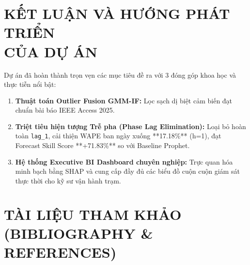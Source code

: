 \documentclass[12pt,a4paper]{article}
\begin{document}
\section[KẾT LUẬN VÀ HƯỚNG PHÁT TRIỂN]{KẾT LUẬN VÀ HƯỚNG PHÁT TRIỂN\\CỦA DỰ ÁN}
Dự án đã hoàn thành trọn vẹn các mục tiêu đề ra với 3 đóng góp khoa học và thực tiễn nổi bật:
\begin{enumerate}
    \item \textbf{Thuật toán Outlier Fusion GMM-IF:} Lọc sạch dị biệt cảm biến đạt chuẩn bài báo IEEE Access 2025.
    \item \textbf{Triệt tiêu hiện tượng Trễ pha (Phase Lag Elimination):} Loại bỏ hoàn toàn \texttt{lag\_1}, cải thiện WAPE ban ngày xuống **17.18\%** (h=1), đạt Forecast Skill Score **+71.83\%** so với Baseline Prophet.
    \item \textbf{Hệ thống Executive BI Dashboard chuyên nghiệp:} Trực quan hóa minh bạch bằng SHAP và cung cấp đầy đủ các biểu đồ cuộn cuộn giám sát thực thời cho kỹ sư vận hành trạm.
\end{enumerate}


\section[TÀI LIỆU THAM KHẢO]{TÀI LIỆU THAM KHẢO\\(BIBLIOGRAPHY \& REFERENCES)}
\end{document}
